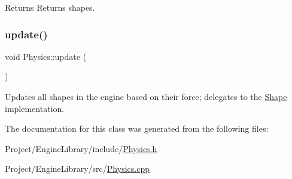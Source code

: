 \begin{DoxyReturn}{Returns}
Returns shapes. 
\end{DoxyReturn}
\mbox{\label{class_physics_a309579d8a466dbcc36c6b4db136b1e9b}} 
\subsubsection{\texorpdfstring{update()}{update()}}
{\footnotesize\ttfamily void Physics\+::update (\begin{DoxyParamCaption}{ }\end{DoxyParamCaption})}



Updates all shapes in the engine based on their force; delegates to the \mbox{\hyperlink{class_shape}{Shape}} implementation. 



The documentation for this class was generated from the following files\+:\begin{DoxyCompactItemize}
\item 
Project/\+Engine\+Library/include/\mbox{\hyperlink{_physics_8h}{Physics.\+h}}\item 
Project/\+Engine\+Library/src/\mbox{\hyperlink{_physics_8cpp}{Physics.\+cpp}}\end{DoxyCompactItemize}
